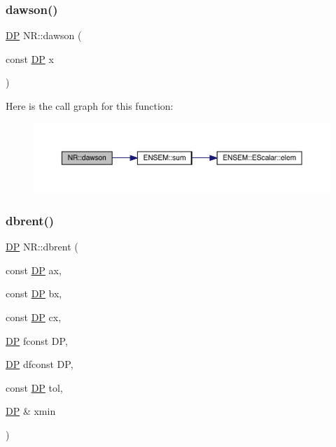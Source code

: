 \mbox{\label{namespaceNR_a6e1128d2427bfc7d48d0f09057399227}} 
\subsubsection{\texorpdfstring{dawson()}{dawson()}}
{\footnotesize\ttfamily \mbox{\hyperlink{namespaceNR_af6ff762dd605ff477b8e52387253a02a}{DP}} N\+R\+::dawson (\begin{DoxyParamCaption}\item[{const \mbox{\hyperlink{namespaceNR_af6ff762dd605ff477b8e52387253a02a}{DP}}}]{x }\end{DoxyParamCaption})}

Here is the call graph for this function\+:\nopagebreak
\begin{figure}[H]
\begin{center}
\leavevmode
\includegraphics[width=350pt]{da/d46/namespaceNR_a6e1128d2427bfc7d48d0f09057399227_cgraph}
\end{center}
\end{figure}
\mbox{\label{namespaceNR_af1d68c637282cf655b5c683b052a0b6d}} 
\subsubsection{\texorpdfstring{dbrent()}{dbrent()}}
{\footnotesize\ttfamily \mbox{\hyperlink{namespaceNR_af6ff762dd605ff477b8e52387253a02a}{DP}} N\+R\+::dbrent (\begin{DoxyParamCaption}\item[{const \mbox{\hyperlink{namespaceNR_af6ff762dd605ff477b8e52387253a02a}{DP}}}]{ax,  }\item[{const \mbox{\hyperlink{namespaceNR_af6ff762dd605ff477b8e52387253a02a}{DP}}}]{bx,  }\item[{const \mbox{\hyperlink{namespaceNR_af6ff762dd605ff477b8e52387253a02a}{DP}}}]{cx,  }\item[{\mbox{\hyperlink{namespaceNR_af6ff762dd605ff477b8e52387253a02a}{DP}} }]{fconst DP,  }\item[{\mbox{\hyperlink{namespaceNR_af6ff762dd605ff477b8e52387253a02a}{DP}} }]{dfconst DP,  }\item[{const \mbox{\hyperlink{namespaceNR_af6ff762dd605ff477b8e52387253a02a}{DP}}}]{tol,  }\item[{\mbox{\hyperlink{namespaceNR_af6ff762dd605ff477b8e52387253a02a}{DP}} \&}]{xmin }\end{DoxyParamCaption})}

